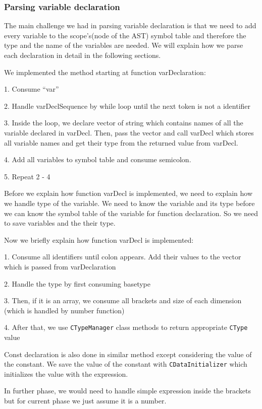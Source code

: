 \documentclass[12pt]{article}
\begin{document}
\subsubsection{Parsing variable declaration}
The main challenge we had in parsing variable declaration is that we need to add every variable to the scope’s(node of the AST) symbol table and therefore the type and the name of the variables are needed. 
We will explain how we parse each declaration in detail in the following sections.
\begin{MyIndentedList}
    \item We implemented the method starting at function varDeclaration:
    \begin{MyIndentedList}
        \item 1. Consume “var”  
        \item 2. Handle varDeclSequence by while loop until the next token is not a identifier
        \item 3. Inside the loop, we declare vector of string which contains names of all the variable declared in varDecl.
        Then, pass the vector and call varDecl which stores all variable names and get their type from the returned value from varDecl.
        \item 4. Add all variables to symbol table and consume semicolon.
        \item 5. Repeat 2 - 4
    \end{MyIndentedList}
    \item Before we explain how function varDecl is implemented, we need to explain how we handle type of the variable.
    We need to know the variable and its type before we can know the symbol table of the variable for function declaration.
    So we need to save variables and the their type.\\
    \item Now we briefly explain how function varDecl is implemented:
    \begin{MyIndentedList}
        \item 1. Consume all identifiers until colon appears. Add their values to the vector which is passed from varDeclaration
        \item 2. Handle the type by first consuming basetype
        \item 3. Then, if it is an array, we consume all brackets and size of each dimension (which is handled by number function)
        \item 4. After that, we use \texttt{CTypeManager} class methods to return appropriate \texttt{CType} value
    \end{MyIndentedList}
    \item Const declaration is also done in similar method except considering the value of the constant.
    We save the value of the constant with \texttt{CDataInitializer} which initializes the value with the expression.
    \item  In further phase, we would need to handle simple expression inside the brackets but for current phase we just assume it is a number.  \\
\end{MyIndentedList}
\end{document}
